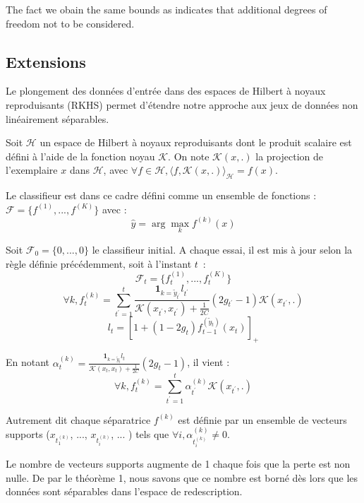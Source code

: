 \documentclass[preprint,12pt,authoryear]{elsarticle}
\begin{document}
The fact we obain the same bounds as \cite{crammer2006online} indicates that additional degrees of freedom not to be considered.   

\subsection{Extensions}
Le plongement des données d'entrée dans des espaces de Hilbert à noyaux reproduisants (RKHS) permet d'étendre notre approche aux jeux de données non linéairement séparables. 

Soit $\mathcal{H}$ un espace de Hilbert à noyaux reproduisants dont le produit scalaire est défini à l'aide de la fonction noyau $\mathcal{K}$. On note $\mathcal{K}(x,.)$ la projection de l'exemplaire $x$ dans $\mathcal{H}$, avec $\forall f \in \mathcal{H}, \langle f,\mathcal{K}(x,.)\rangle_\mathcal{H} = f(x) $.


Le classifieur est dans ce cadre défini comme un ensemble de fonctions : $\mathcal{F} = \{f^{(1)}, ..., f^{(K)}\}$ avec :
$$\hat{y} = \arg \max_k f^{(k)}(x)$$

Soit $\mathcal{F}_0=\{0, ..., 0\}$ le classifieur initial. A chaque essai, il est mis à jour selon la règle définie précédemment, soit à l'instant $t$~:
$$\mathcal{F}_t = \{f^{(1)}_t, ..., f^{(K)}_t\}$$
$$\forall k, f^{(k)}_t = \sum_{t^\prime = 1} ^t  \frac {\mathbf{1}_{k=\tilde{y}_{t^\prime}}l_{t^\prime}}{\mathcal{K}(x_{t^\prime},x_{t^\prime})+\frac{1}{2C}} (2g_{t^\prime} - 1)\mathcal{K}(x_{t^\prime},.)$$
$$ l_t = [1 + (1-2g_t) f_{t-1}^{(\tilde{y}_t)}(x_t)]_+$$

En notant $\alpha_t^{(k)} = \frac {\mathbf{1}_{k=\tilde{y}_{t}}l_{t}}{\mathcal{K}(x_{t},x_{t})+\frac{1}{2C}} (2g_{t} - 1)$, il vient :
$$\forall k, f^{(k)}_t = \sum_{t^\prime = 1} ^t \alpha_{t^\prime}^{(k)} \mathcal{K}(x_{t^\prime},.)$$

Autrement dit chaque séparatrice $f^{(k)}$ est définie par un ensemble de vecteurs supports ($x_{t_1^{(k)}}$, ..., $x_{t_i^{(k)}}$, ...  ) tels que $\forall i, \alpha_{t_i^{(k)}}^{(k)} \neq 0$.


Le nombre de vecteurs supports augmente de 1 chaque fois que la perte est non nulle. De par le théorème 1, nous savons que ce nombre est borné dès lors que les données sont séparables dans l'espace de redescription. 
\end{document}
